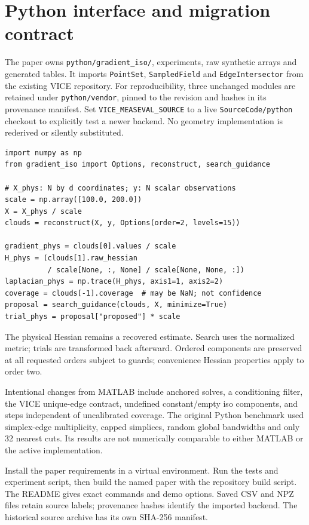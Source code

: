 \section{Python interface and migration contract}
The paper owns \texttt{python/gradient\_iso/}, experiments, raw synthetic
arrays and generated tables. It imports \texttt{PointSet},
\texttt{SampledField} and \texttt{EdgeIntersector} from the existing VICE
repository. For reproducibility, three unchanged modules are retained under
\texttt{python/vendor}, pinned to the revision and hashes in its provenance
manifest. Set \texttt{VICE\_MEASEVAL\_SOURCE} to a live \texttt{SourceCode/python}
checkout to explicitly test a newer backend. No geometry implementation is
rederived or silently substituted.

\begin{lstlisting}[style=python,float=htbp,caption={A normalized two-order reconstruction. Each cloud has its own support and source-simplex provenance.}]
import numpy as np
from gradient_iso import Options, reconstruct, search_guidance

# X_phys: N by d coordinates; y: N scalar observations
scale = np.array([100.0, 200.0])
X = X_phys / scale
clouds = reconstruct(X, y, Options(order=2, levels=15))

gradient_phys = clouds[0].values / scale
H_phys = (clouds[1].raw_hessian
          / scale[None, :, None] / scale[None, None, :])
laplacian_phys = np.trace(H_phys, axis1=1, axis2=2)
coverage = clouds[-1].coverage  # may be NaN; not confidence
proposal = search_guidance(clouds, X, minimize=True)
trial_phys = proposal["proposed"] * scale
\end{lstlisting}

The physical Hessian remains a recovered estimate. Search uses the normalized
metric; trials are transformed back afterward. Ordered components are
preserved at all requested orders subject to guards; convenience Hessian
properties apply to order two.

Intentional changes from MATLAB include anchored solves, a conditioning
filter, the VICE unique-edge contract, undefined constant/empty iso
components, and steps independent of uncalibrated coverage. The original
Python benchmark used simplex-edge multiplicity, capped simplices, random
global bandwidths and only 32 nearest cuts. Its results are not numerically
comparable to either MATLAB or the active implementation.

Install the paper requirements in a virtual environment. Run the tests and
experiment script, then build the named paper with the repository build
script. The README gives exact commands and demo options. Saved CSV and NPZ
files retain source labels; provenance hashes identify the imported backend.
The historical source archive has its own SHA-256 manifest.
